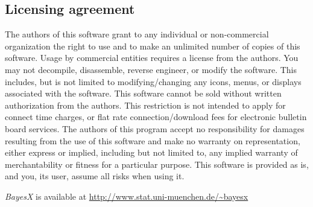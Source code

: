 \subsection*{Licensing agreement} The authors of this software grant
to any individual or non-commercial organization the right to use
and to make an unlimited number of copies of this software. Usage
by commercial entities requires a license from the authors. You
may not decompile, disassemble, reverse engineer, or modify the
software. This includes, but is not limited to modifying/changing
any icons, menus, or displays associated with the software. This
software cannot be sold without written authorization from the
authors. This restriction is not intended to apply for connect
time charges, or flat rate connection/download fees for electronic
bulletin board services. The authors of this program accept no
responsibility for damages resulting from the use of this software
and make no warranty on representation, either express or implied,
including but not limited to, any implied warranty of
merchantability or fitness for a particular purpose. This software
is provided as is, and you, its user, assume all risks when using
it.

\vspace{0.5cm}

{\em BayesX} is available at {
\href{http://www.stat.uni-muenchen.de/~bayesx}{http://www.stat.uni-muenchen.de/\~{}bayesx}}

\newpage

 \tableofcontents
\hypertarget{contents}{}


\newpage

